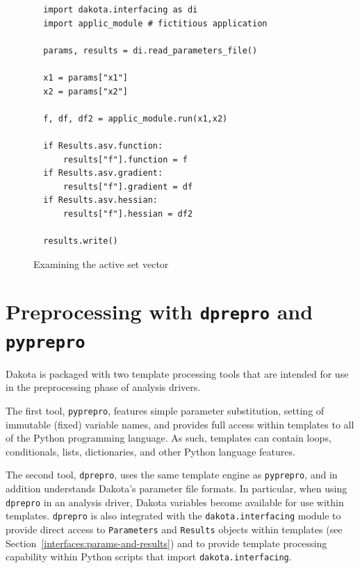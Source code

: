 {\begin{figure}
\begin{bigbox}
\begin{small}
\begin{verbatim}
  import dakota.interfacing as di
  import applic_module # fictitious application

  params, results = di.read_parameters_file()

  x1 = params["x1"]
  x2 = params["x2"]

  f, df, df2 = applic_module.run(x1,x2)

  if Results.asv.function:
      results["f"].function = f
  if Results.asv.gradient:
      results["f"].gradient = df
  if Results.asv.hessian:
      results["f"].hessian = df2

  results.write()
\end{verbatim}


\end{small}
\end{bigbox}
\caption{Examining the active set vector}
\label{diexample:asv}
\end{figure}

\section{Preprocessing with \texttt{dprepro} and \texttt{pyprepro}}\label{interfaces:dprepro-and-pyprepro}

Dakota is packaged with two template processing tools that are
intended for use in the preprocessing phase of analysis drivers.

The first tool, \texttt{pyprepro}, features simple parameter 
substitution, setting of immutable (fixed) variable names, and 
provides full access within templates to all of the Python programming 
language. As such, templates can contain loops, conditionals, lists, 
dictionaries, and other Python language features.

The second tool, \texttt{dprepro}, uses the same template engine
as \texttt{pyprepro}, and in addition understands Dakota's parameter
file formats. In particular, when using \texttt{dprepro} in an analysis driver, 
Dakota variables become available for use within templates. \texttt{dprepro} 
is also integrated with the \texttt{dakota.interfacing} module to provide direct
access to \texttt{Parameters} and \texttt{Results} objects within templates 
(see Section~\ref{interfaces:params-and-results}) and to provide template 
processing capability within Python scripts that import 
\texttt{dakota.interfacing}.

}
